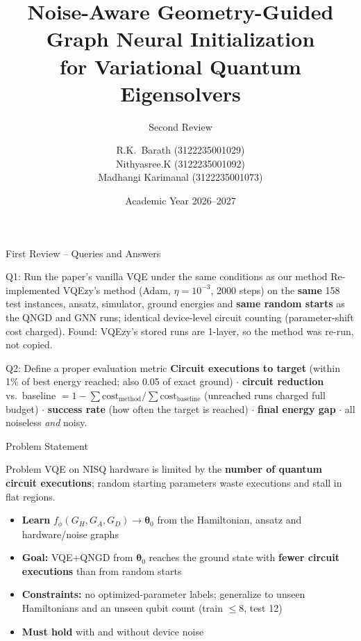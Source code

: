 \documentclass[aspectratio=169,11pt]{beamer}
\title[GNN Initialization for VQE + QNGD]{Noise-Aware Geometry-Guided Graph Neural Initialization\\for Variational Quantum Eigensolvers}
\subtitle{Second Review}
\author[Barath, Nithyasree, Madhangi]{%
  R.K.\ Barath (3122235001029)\\
  Nithyasree.K (3122235001092)\\
  Madhangi Karimanal (3122235001073)
}
\institute[SSN College of Engineering]{%
  Guided by: Dr.\ Sneka Nandhini\\[2mm]
  Department of Computer Science and Engineering\\
  Sri Sivasubramaniya Nadar College of Engineering
}
\date{Academic Year 2026--2027}
\begin{document}
\begin{frame}[plain]
  \titlepage
\end{frame}

\begin{frame}{First Review -- Queries and Answers}
  \small
  \begin{block}{Q1: Run the paper's vanilla VQE under the same conditions as our method}
    \scriptsize Re-implemented VQEzy's method (Adam, $\eta=10^{-3}$, 2000 steps) on the
    \textbf{same} 158 test instances, ansatz, simulator, ground energies and \textbf{same random
    starts} as the QNGD and GNN runs; identical device-level circuit counting (parameter-shift
    cost charged). Found: VQEzy's stored runs are 1-layer, so the method was re-run, not copied.
  \end{block}
  \begin{block}{Q2: Define a proper evaluation metric}
    \scriptsize \textbf{Circuit executions to target} (within 1\% of best energy reached; also 0.05
    of exact ground) $\cdot$ \textbf{circuit reduction} vs.\ baseline
    $=1-\sum\text{cost}_{\text{method}}/\sum\text{cost}_{\text{baseline}}$ (unreached runs charged
    full budget) $\cdot$ \textbf{success rate} (how often the target is reached) $\cdot$
    \textbf{final energy gap} $\cdot$ all noiseless \emph{and} noisy.
  \end{block}
\end{frame}

\begin{frame}{Problem Statement}
  \begin{alertblock}{Problem}
    VQE on NISQ hardware is limited by the \textbf{number of quantum circuit executions};
    random starting parameters waste executions and stall in flat regions.
  \end{alertblock}
  \vspace{0.3cm}
  \begin{itemize}
    \item \textbf{Learn} $f_\phi(G_H,G_A,G_D)\rightarrow\boldsymbol\theta_0$ from the Hamiltonian,
          ansatz and hardware/noise graphs
    \item \textbf{Goal:} VQE+QNGD from $\boldsymbol\theta_0$ reaches the ground state with
          \textbf{fewer circuit executions} than from random starts
    \item \textbf{Constraints:} no optimized-parameter labels; generalize to unseen Hamiltonians
          and an unseen qubit count (train $\le 8$, test 12)
    \item \textbf{Must hold} with and without device noise
  \end{itemize}
\end{frame}
\end{document}
